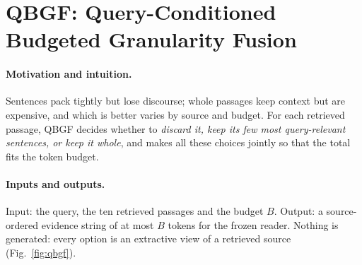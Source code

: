 \documentclass[10pt,twocolumn,letterpaper]{article}
\begin{document}
\section{QBGF: Query-Conditioned Budgeted Granularity Fusion}\label{sec:qbgf}
\paragraph{Motivation and intuition.} Sentences pack tightly but lose discourse; whole passages keep context but are expensive, and which is better varies by source and budget. For each retrieved passage, QBGF decides whether to \emph{discard it, keep its few most query-relevant sentences, or keep it whole}, and makes all these choices jointly so that the total fits the token budget.

\paragraph{Inputs and outputs.} Input: the query, the ten retrieved passages and the budget $B$. Output: a source-ordered evidence string of at most $B$ tokens for the frozen reader. Nothing is generated: every option is an extractive view of a retrieved source (Fig.~\ref{fig:qbgf}).
\end{document}
